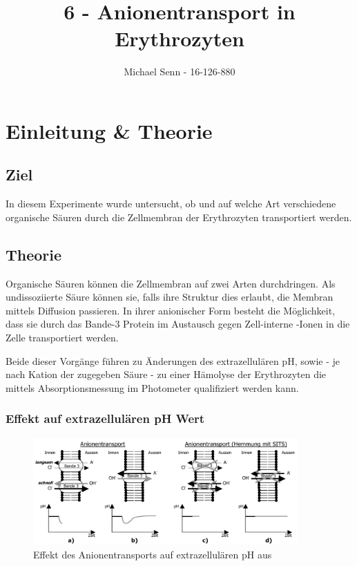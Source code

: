 \documentclass[a4paper,german]{scrreprt}
\title{6 - Anionentransport in Erythrozyten}
\author{Michael Senn \maillink{michael.senn@students.unibe.ch} - 16-126-880}
\date{\printdate}
\begin{document}
\maketitle

\chapter{Einleitung \& Theorie}

\section{Ziel}

In diesem Experimente wurde untersucht, ob und auf welche Art verschiedene
organische Säuren durch die Zellmembran der Erythrozyten transportiert werden.

\section{Theorie}

Organische Säuren können die Zellmembran auf zwei Arten durchdringen. Als
undissoziierte Säure können sie, falls ihre Struktur dies erlaubt, die Membran
mittels Diffusion passieren. In ihrer anionischer Form besteht die Möglichkeit,
dass sie durch das Bande-3 Protein im Austausch gegen Zell-interne
-Ionen in die Zelle transportiert werden.

Beide dieser Vorgänge führen zu Änderungen des extrazellulären pH, sowie - je
nach Kation der zugegeben Säure - zu einer Hämolyse der Erythrozyten die
mittels Absorptionsmessung im Photometer qualifiziert werden kann.

\subsection{Effekt auf extrazellulären pH Wert}

\begin{figure}[h]
	\centering
	\includegraphics[width=0.9\textwidth]{img/th_transport_ph_ani}
	\caption{Effekt des Anionentransports auf extrazellulären pH aus \cite{skriptv6}}
	\label{fig:transport_ph_ani}
\end{figure}
\end{document}
